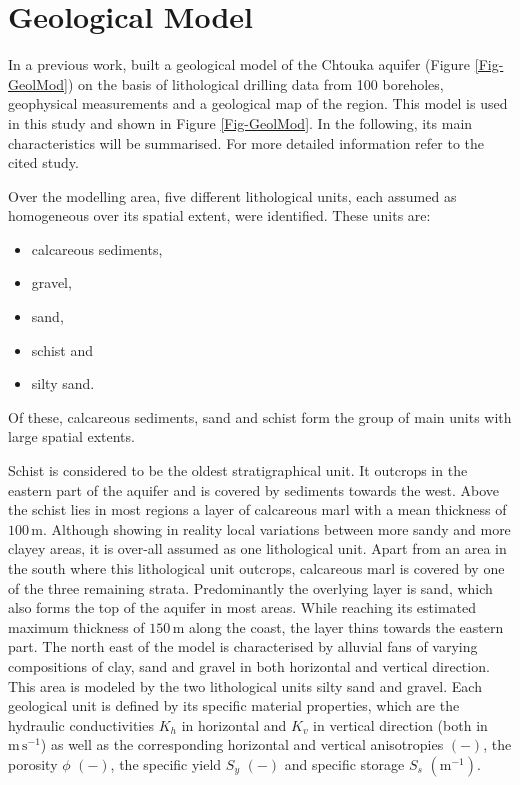 
\section{Geological Model}
\label{Sec-GeolModel}

In a previous work, \textcite{Horn.2021} built a geological model of the Chtouka aquifer (Figure \ref{Fig-GeolMod}) on the basis of lithological drilling data from 100 boreholes, geophysical measurements and a geological map of the region. 
This model is used in this study and shown in Figure \ref{Fig-GeolMod}. 
In the following, its main characteristics will be summarised. 
For more detailed information refer to the cited study.

Over the modelling area, five different lithological units, each assumed as homogeneous over its spatial extent, were identified. 
These units are:

\begin{itemize}
    \item calcareous sediments,
    \item gravel,
    \item sand,
    \item schist and
    \item silty sand.
\end{itemize}

Of these, calcareous sediments, sand and schist form the group of main units with large spatial extents. 

Schist is considered to be the oldest stratigraphical unit. 
It outcrops in the eastern part of the aquifer and is covered by sediments towards the west. 
Above the schist lies in most regions a layer of calcareous marl with a mean thickness of $100 \, \textrm{m}$. 
Although showing in reality local variations between more sandy and more clayey areas, it is over-all assumed as one lithological unit. 
Apart from an area in the south where this lithological unit outcrops, calcareous marl is covered by one of the three remaining strata. 
Predominantly the overlying layer is sand, which also forms the top of the aquifer in most areas. 
While reaching its estimated maximum thickness of $150 \, \textrm{m}$ along the coast, the layer thins towards the eastern part. 
The north east of the model is characterised by alluvial fans of varying compositions of clay, sand and gravel in both horizontal and vertical direction. 
This area is modeled by the two lithological units silty sand and gravel. 
Each geological unit is defined by its specific material properties, which are the hydraulic conductivities $K_h$ in horizontal and $K_v$ in vertical direction (both in $\textrm{m} \, \textrm{s}^{-1}$) as well as the corresponding horizontal and vertical anisotropies $\left( - \right)$, the porosity $\phi$ $\left( - \right)$, the specific yield $S_y$ $\left( - \right)$ and specific storage $S_s$ $\left( \textrm{m}^{-1} \right)$.

